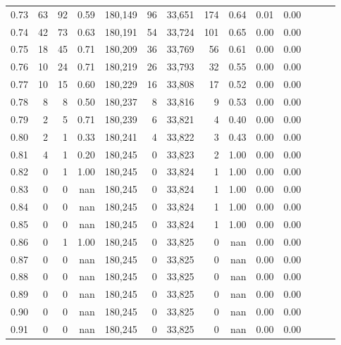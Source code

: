 \begin{tabular}{rrrrrrrrrrrrrr}
0.73 &     63 &     92 &  0.59 &  180,149 &       96 &  33,651 &     174 &  0.64 &  0.01 &      0.00 \\
0.74 &     42 &     73 &  0.63 &  180,191 &       54 &  33,724 &     101 &  0.65 &  0.00 &      0.00 \\
0.75 &     18 &     45 &  0.71 &  180,209 &       36 &  33,769 &      56 &  0.61 &  0.00 &      0.00 \\
0.76 &     10 &     24 &  0.71 &  180,219 &       26 &  33,793 &      32 &  0.55 &  0.00 &      0.00 \\
0.77 &     10 &     15 &  0.60 &  180,229 &       16 &  33,808 &      17 &  0.52 &  0.00 &      0.00 \\
0.78 &      8 &      8 &  0.50 &  180,237 &        8 &  33,816 &       9 &  0.53 &  0.00 &      0.00 \\
0.79 &      2 &      5 &  0.71 &  180,239 &        6 &  33,821 &       4 &  0.40 &  0.00 &      0.00 \\
0.80 &      2 &      1 &  0.33 &  180,241 &        4 &  33,822 &       3 &  0.43 &  0.00 &      0.00 \\
0.81 &      4 &      1 &  0.20 &  180,245 &        0 &  33,823 &       2 &  1.00 &  0.00 &      0.00 \\
0.82 &      0 &      1 &  1.00 &  180,245 &        0 &  33,824 &       1 &  1.00 &  0.00 &      0.00 \\
0.83 &      0 &      0 &   nan &  180,245 &        0 &  33,824 &       1 &  1.00 &  0.00 &      0.00 \\
0.84 &      0 &      0 &   nan &  180,245 &        0 &  33,824 &       1 &  1.00 &  0.00 &      0.00 \\
0.85 &      0 &      0 &   nan &  180,245 &        0 &  33,824 &       1 &  1.00 &  0.00 &      0.00 \\
0.86 &      0 &      1 &  1.00 &  180,245 &        0 &  33,825 &       0 &   nan &  0.00 &      0.00 \\
0.87 &      0 &      0 &   nan &  180,245 &        0 &  33,825 &       0 &   nan &  0.00 &      0.00 \\
0.88 &      0 &      0 &   nan &  180,245 &        0 &  33,825 &       0 &   nan &  0.00 &      0.00 \\
0.89 &      0 &      0 &   nan &  180,245 &        0 &  33,825 &       0 &   nan &  0.00 &      0.00 \\
0.90 &      0 &      0 &   nan &  180,245 &        0 &  33,825 &       0 &   nan &  0.00 &      0.00 \\
0.91 &      0 &      0 &   nan &  180,245 &        0 &  33,825 &       0 &   nan &  0.00 &      0.00 \\

\end{tabular}
